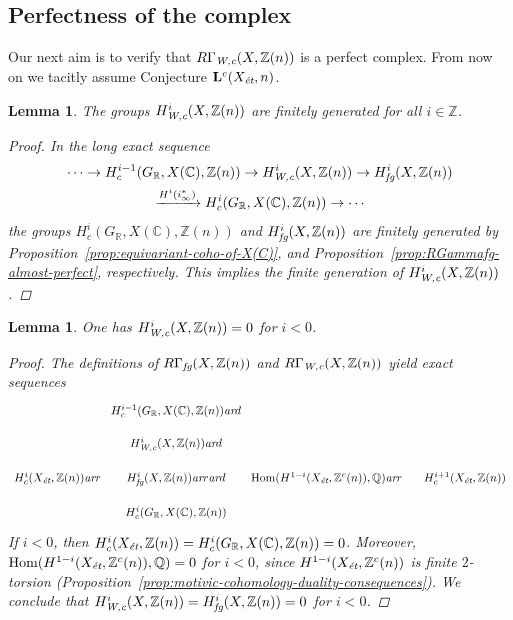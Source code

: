 \documentclass[leqno,12pt]{article}
\theoremstyle{plain}
\newtheorem{lemma}[theorem]{\indent\sc Lemma}
\theoremstyle{definition}
\DeclareMathOperator{\Hom}{Hom}
\newcommand{\CC}{\mathbb{C}}
\newcommand{\QQ}{\mathbb{Q}}
\newcommand{\RR}{\mathbb{R}}
\newcommand{\ZZ}{\mathbb{Z}}
\newcommand{\Wc}{\text{\it W,c}}
\newcommand{\ar}{\text{\it ar}}
\newcommand{\et}{\text{\it \'{e}t}}
\newcommand{\fg}{\text{\it fg}}
\begin{document}
\subsection*{Perfectness of the complex}

Our next aim is to verify that $R\Gamma_\Wc (X, \ZZ(n))$ is a perfect
complex. From now on we tacitly assume Conjecture $\mathbf{L}^c (X_\et,n)$.

\begin{lemma}
  The groups $H^i_\Wc (X, \ZZ(n))$ are finitely generated for all $i \in \ZZ$.

  \begin{proof}
    In the long exact sequence
    \begin{multline*}
      \cdots \to H^{i-1}_c (G_\RR, X (\CC), \ZZ (n)) \to
      H^i_\Wc (X,\ZZ(n)) \to
      H^i_\fg (X,\ZZ(n)) \\
      \xrightarrow{H^i (i_\infty^*)}
      H^i_c (G_\RR, X (\CC), \ZZ (n)) \to \cdots
    \end{multline*}
    the groups $H^i_c (G_\RR, X (\CC), \ZZ (n))$ and $H^i_\fg (X, \ZZ(n))$ are
    finitely generated by
    Proposition~\ref{prop:equivariant-coho-of-X(C)}, and
    Proposition~\ref{prop:RGammafg-almost-perfect}, respectively.
    This implies the finite generation of $H^i_\Wc (X, \ZZ(n))$.
  \end{proof}
\end{lemma}

\begin{lemma}
  One has $H^i_\Wc (X,\ZZ(n)) = 0$ for $i < 0$.

  \begin{proof}
    The definitions of $R\Gamma_\fg (X, \ZZ(n))$ and $R\Gamma_\Wc (X, \ZZ(n))$
    yield exact sequences
    \[ \begin{tikzcd}[row sep=1em,column sep=1em]
        &[-1em] H^{i-1}_c (G_\RR, X (\CC), \ZZ (n)) \ar{d} &[-1em] \\
        & H^i_\Wc (X, \ZZ(n)) \ar{d} \\
        H^i_c (X_\et, \ZZ(n)) \ar{r} & H^i_\fg (X, \ZZ(n)) \ar{r}\ar{d} & \Hom (H^{1-i} (X_\et, \ZZ^c (n)), \QQ) \ar{r} & H^{i+1}_c (X_\et, \ZZ(n)) \\
        & H^i_c (G_\RR, X (\CC), \ZZ (n))
      \end{tikzcd} \]
    If $i < 0$, then
    $H^i_c (X_\et, \ZZ(n)) = H^i_c (G_\RR, X (\CC), \ZZ (n)) = 0$.
    Moreover, $\Hom (H^{1-i} (X_\et, \ZZ^c (n)), \QQ) = 0$ for $i < 0$, since
    $H^{1-i} (X_\et, \ZZ^c (n))$ is finite $2$-torsion
    (Proposition~\ref{prop:motivic-cohomology-duality-consequences}).  We
    conclude that $H^i_\Wc (X, \ZZ(n)) = H^i_\fg (X, \ZZ(n)) = 0$ for $i < 0$.
  \end{proof}
\end{lemma}
\end{document}
